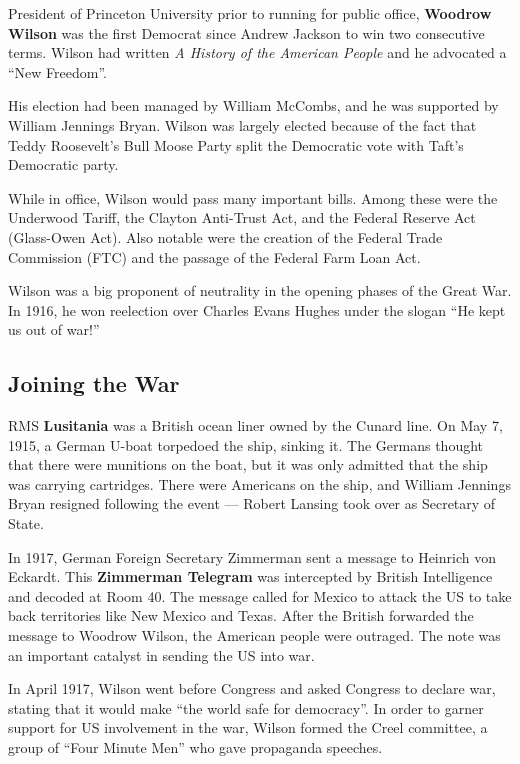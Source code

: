 President of Princeton University prior to running for public office,
\textbf{Woodrow Wilson} was the first Democrat since Andrew Jackson to win two consecutive terms.
Wilson had written \textit{A History of the American People} and he advocated a ``New Freedom''.

His election had been managed by William McCombs, and he was supported by William Jennings Bryan.
Wilson was largely elected because of the fact that Teddy Roosevelt's Bull Moose Party
split the Democratic vote with Taft's Democratic party.

While in office, Wilson would pass many important bills.
Among these were the Underwood Tariff, the Clayton Anti-Trust Act, and the Federal Reserve Act (Glass-Owen Act).
Also notable were the creation of the Federal Trade Commission (FTC) and the passage of the Federal Farm Loan Act.

Wilson was a big proponent of neutrality in the opening phases of the Great War.
In 1916, he won reelection over Charles Evans Hughes under the slogan ``He kept us out of war!''

\subsection*{Joining the War}

RMS \textbf{Lusitania} was a British ocean liner owned by the Cunard line.
On May 7, 1915, a German U-boat torpedoed the ship, sinking it.
The Germans thought that there were munitions on the boat,
but it was only admitted that the ship was carrying cartridges.
There were Americans on the ship,
and William Jennings Bryan resigned following the event ---
Robert Lansing took over as Secretary of State.

In 1917, German Foreign Secretary Zimmerman sent a message to Heinrich von Eckardt.
This \textbf{Zimmerman Telegram} was intercepted by British Intelligence and decoded at Room 40.
The message called for Mexico to attack the US to take back territories like New Mexico and Texas.
After the British forwarded the message to Woodrow Wilson, the American people were outraged.
The note was an important catalyst in sending the US into war.

In April 1917, Wilson went before Congress and asked Congress to declare war,
stating that it would make ``the world safe for democracy''.
In order to garner support for US involvement in the war, Wilson formed the Creel committee,
a group of ``Four Minute Men'' who gave propaganda speeches.

